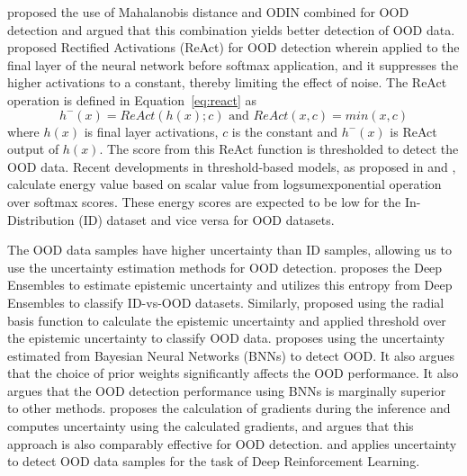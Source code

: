     \cite{Maha_plus_ODIN} proposed the use of Mahalanobis distance and ODIN combined for OOD detection and argued that this combination yields better detection of OOD data.
    \cite{ReAct} proposed Rectified Activations (ReAct) for OOD detection wherein applied to the final layer of the neural network before softmax application, and it suppresses the higher activations to a constant, thereby limiting the effect of noise. 
    The ReAct operation is defined in Equation~\ref{eq:react} as
    \begin{equation}
        h^{-}(x) = ReAct(h(x); c) \text{ and } ReAct(x, c) = min(x, c) \label{eq:react}
    \end{equation} 
    where $h(x)$ is final layer activations, $c$ is the constant and $h^{-}(x)$ is ReAct output of $h(x)$.
    The score from this ReAct function is thresholded to detect the OOD data. 
    Recent developments in threshold-based models, as proposed in \cite{Energy_OOD_1} and \cite{Energy_OOD_2}, calculate energy value based on scalar value from logsumexponential operation over softmax scores.
    These energy scores are expected to be low for the In-Distribution (ID) dataset and vice versa for OOD datasets.

    The OOD data samples have higher uncertainty than ID samples, allowing us to use the uncertainty estimation methods for OOD detection.
    \cite{lakshminarayanan2016simple} proposes the Deep Ensembles to estimate epistemic uncertainty and utilizes this entropy from Deep Ensembles to classify ID-vs-OOD datasets.
    Similarly, \cite{JAmersfoot_RBF} proposed using the radial basis function to calculate the epistemic uncertainty and applied threshold over the epistemic uncertainty to classify OOD data.
    \cite{UOOD_BNN} proposes using the uncertainty estimated from Bayesian Neural Networks (BNNs) to detect OOD.
    It also argues that the choice of prior weights significantly affects the OOD performance.
    It also argues that the OOD detection performance using BNNs is marginally superior to other methods.
    \cite{Grad_UOOD} proposes the calculation of gradients during the inference and computes uncertainty using the calculated gradients, and argues that this approach is also comparably effective for OOD detection.
    \cite{UOOD_RL1} and \cite{UOOD_RL2} applies uncertainty to detect OOD data samples for the task of Deep Reinforcement Learning.
    
